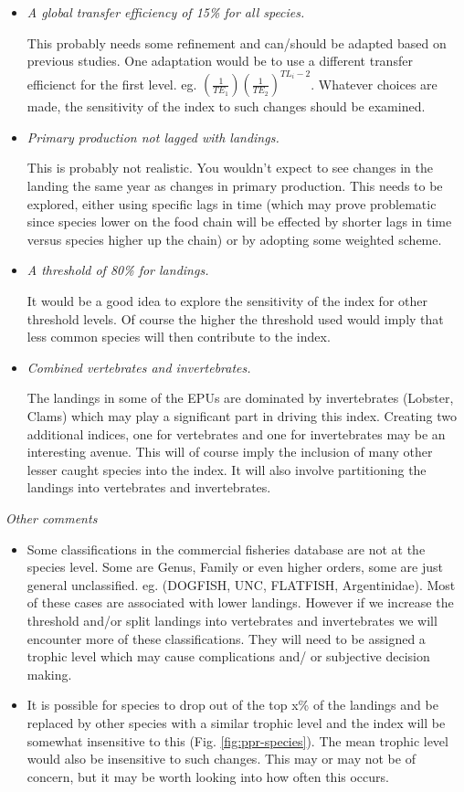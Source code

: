 \documentclass[
  10pt,
]{article}
\begin{document}
\begin{itemize}
\item
  \emph{A global transfer efficiency of 15\% for all species.}

  This probably needs some refinement and can/should be adapted based on
  previous studies. One adaptation would be to use a different transfer
  efficienct for the first level. eg.
  \(\left( \frac{1}{TE_1}\right) \left(\frac{1}{TE_2}\right)^{TL_i-2}\).
  Whatever choices are made, the sensitivity of the index to such
  changes should be examined.
\item
  \emph{Primary production not lagged with landings.}

  This is probably not realistic. You wouldn't expect to see changes in
  the landing the same year as changes in primary production. This needs
  to be explored, either using specific lags in time (which may prove
  problematic since species lower on the food chain will be effected by
  shorter lags in time versus species higher up the chain) or by
  adopting some weighted scheme.
\item
  \emph{A threshold of 80\% for landings.}

  It would be a good idea to explore the sensitivity of the index for
  other threshold levels. Of course the higher the threshold used would
  imply that less common species will then contribute to the index.
\item
  \emph{Combined vertebrates and invertebrates.}

  The landings in some of the EPUs are dominated by invertebrates
  (Lobster, Clams) which may play a significant part in driving this
  index. Creating two additional indices, one for vertebrates and one
  for invertebrates may be an interesting avenue. This will of course
  imply the inclusion of many other lesser caught species into the
  index. It will also involve partitioning the landings into vertebrates
  and invertebrates.
\end{itemize}

\emph{Other comments}

\begin{itemize}
\item
  Some classifications in the commercial fisheries database are not at
  the species level. Some are Genus, Family or even higher orders, some
  are just general unclassified. eg. (DOGFISH, UNC, FLATFISH,
  Argentinidae). Most of these cases are associated with lower landings.
  However if we increase the threshold and/or split landings into
  vertebrates and invertebrates we will encounter more of these
  classifications. They will need to be assigned a trophic level which
  may cause complications and/ or subjective decision making.
\item
  It is possible for species to drop out of the top x\% of the landings
  and be replaced by other species with a similar trophic level and the
  index will be somewhat insensitive to this (Fig.
  \ref{fig:ppr-species}). The mean trophic level would also be
  insensitive to such changes. This may or may not be of concern, but it
  may be worth looking into how often this occurs.
\end{itemize}
\end{document}
